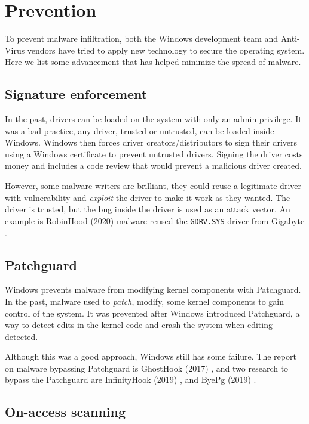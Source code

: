 \section[Prevention]{Prevention}

To prevent malware infiltration, both the Windows development team and
Anti-Virus vendors have tried to apply new technology to secure the operating
system. Here we list some advancement that has helped minimize the spread of
malware.

\subsection[Signature enforcement]{Signature enforcement}

In the past, drivers can be loaded on the system with only an admin privilege.
It was a bad practice, any driver, trusted or untrusted, can be loaded inside
Windows. Windows then forces driver creators/distributors to sign their drivers
using a Windows certificate to prevent untrusted drivers. Signing the driver
costs money and includes a code review that would prevent a malicious driver
created.

However, some malware writers are brilliant, they could reuse a legitimate
driver with vulnerability and \textit{exploit} the driver to make it work as
they wanted. The driver is trusted, but the bug inside the driver is used as an
attack vector. An example is RobinHood (2020) malware reused the
\texttt{GDRV.SYS} driver from Gigabyte \cite{robinhood}.

\subsection[Patchguard]{Patchguard}

Windows prevents malware from modifying kernel components with Patchguard.  In
the past, malware used to \textit{patch}, modify, some kernel components to
gain control of the system.  It was prevented after Windows introduced
Patchguard, a way to detect edits in the kernel code and crash the system when
editing detected.

Although this was a good approach, Windows still has some failure. The report
on malware bypassing Patchguard is GhostHook (2017) \cite{ghosthook}, and two
research to bypass the Patchguard are InfinityHook (2019) \cite{infinityhook},
and ByePg (2019) \cite{byepg}.

\subsection[On-access scanning]{On-access scanning}

